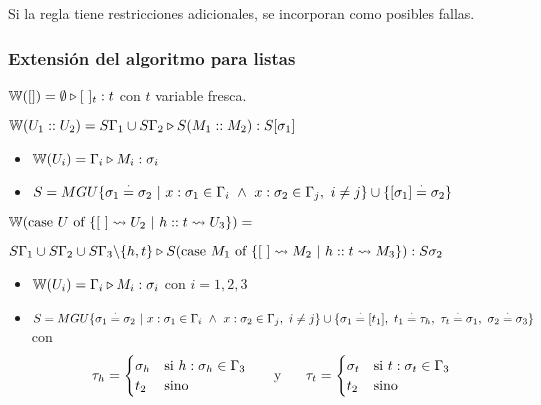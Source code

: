 Si la regla tiene restricciones adicionales, se incorporan como posibles fallas.

\subsubsection{Extensión del algoritmo para listas}
$\mathbb{W}([]) = \emptyset\triangleright [~]_{t} : t$ con $t$ variable fresca.

$\mathbb{W}(U_1::U_2) = S\Gamma_1\cup S\Gamma_2\triangleright S(M_1::M_2) : S[\sigma_1]$

\begin{centrado}
	\begin{itemize}
		\item $\mathbb{W}(U_i) = \Gamma_i\triangleright M_i : \sigma_i$
		\item $S = MGU\{\sigma_1\overset{\cdot}{=} \sigma_2~|~x:\sigma_1\in\Gamma_i~\land~x:\sigma_2\in\Gamma_j,~i\neq j\}\cup\{[\sigma_1]\overset{\cdot}{=}\sigma_2\} $
	\end{itemize}
\end{centrado}


$\mathbb{W}(\text{case } U \text{ of } \{[~]\leadsto U_2~|~h::t\leadsto U_3\}) =$

\quad$S\Gamma_1\cup S\Gamma_2\cup S\Gamma_3\backslash\{h,t\}\triangleright S(\text{case } M_1 \text{ of } \{[~]\leadsto M_2~|~h::t\leadsto M_3\}) : S\sigma_2$

\begin{centrado}
	\begin{itemize}
		\item $\mathbb{W}(U_i) = \Gamma_i\triangleright M_i : \sigma_i$ con $i = 1,2,3$
		\item $S = MGU\{\sigma_1\overset{\cdot}{=} \sigma_2~|~x:\sigma_1\in\Gamma_i~\land~x:\sigma_2\in\Gamma_j,~i\neq j\}\cup\{\sigma_1\overset{\cdot}{=} [t_1],~t_1\overset{\cdot}{=} \tau_h,~\tau_t\overset{\cdot}{=} \sigma_1,~\sigma_2\overset{\cdot}{=}\sigma_3\} $ con 
		\[ \tau_h = \begin{cases} 
		\sigma_h & \text{si } h:\sigma_h\in\Gamma_3 \\
		t_2 & \text{sino} \\
		\end{cases} \hspace*{5mm}\text{ y }\hspace*{5mm}
		\tau_t = \begin{cases} 
		\sigma_t & \text{si } t:\sigma_t\in\Gamma_3 \\
		t_2 & \text{sino} \\
		\end{cases}
		\]
	\end{itemize}
\end{centrado}